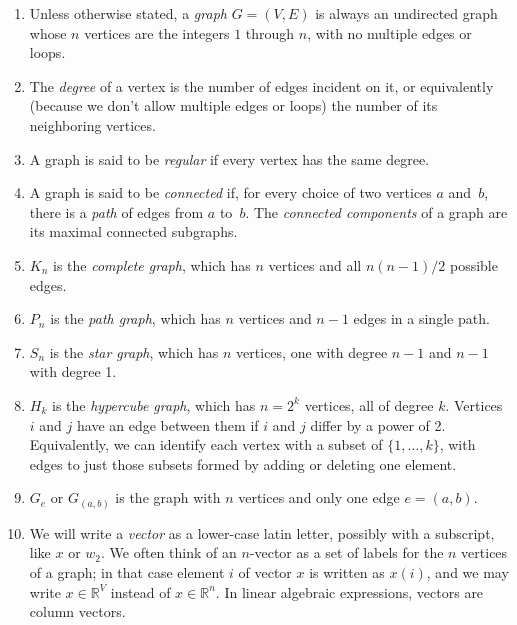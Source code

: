 \documentclass[11pt]{article}
\newcommand{\Real}{\mathbb{R}}      %
\begin{document}
\begin{enumerate}

\item
Unless otherwise stated, a {\em graph} $G = (V,E)$ is always 
an undirected graph whose $n$ vertices are the integers 
$1$ through $n$, with no multiple edges or loops.

\item
The {\em degree} of a vertex is the number of edges incident on it, 
or equivalently (because we don't allow multiple edges or loops)
the number of its neighboring vertices.

\item 
A graph is said to be {\em regular} if every vertex has the same degree.

\item
A graph is said to be {\em connected} if, for every choice of two
vertices $a$ and~$b$, there is a {\em path} of edges from $a$ to~$b$.
The {\em connected components} of a graph are its maximal connected
subgraphs.

\item
$K_n$ is the {\em complete graph}, which has $n$ vertices and all $n(n-1)/2$ possible edges.

\item
$P_n$ is the {\em path graph}, which has $n$ vertices and $n-1$ edges in a single path.

\item
$S_n$ is the {\em star graph}, which has $n$ vertices, one with degree $n-1$ and 
$n-1$ with degree 1.

\item
$H_k$ is the {\em hypercube graph}, which has $n=2^k$ vertices, all of degree $k$.
Vertices $i$ and $j$ have an edge between them if $i$ and $j$ differ by a power of 2.
Equivalently, we can identify each vertex with a subset of $\{1,\ldots,k\}$,
with edges to just those subsets formed by adding or deleting one element.

\item
$G_e$ or $G_{(a,b)}$ is the graph with $n$ vertices and only one edge $e = (a,b)$.

\item
We will write a {\em vector} as a lower-case latin letter, 
possibly with a subscript, like $x$ or $w_2$.  
We often think of an $n$-vector as a set of labels for the
$n$ vertices of a graph; 
in that case element $i$ of vector $x$ is written as $x(i)$,
and we may write $x\in\Real^V$ instead of $x\in\Real^n$.
In linear algebraic expressions, vectors are column vectors.


\end{enumerate}
\end{document}

